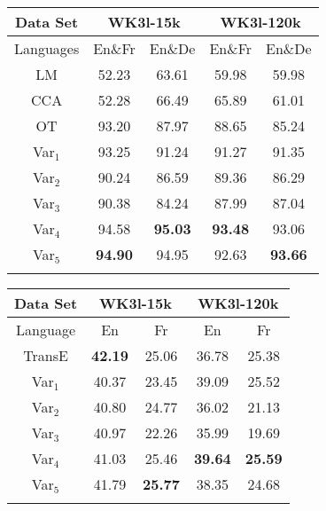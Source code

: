 \documentclass{article}
\begin{document}
\begin{table*}[t!]
\begin{minipage}[t]{0.37\linewidth}
\centering
\captionsetup{justification=centering}
\caption{Accuracy of TWA verification (\%).}\label{tbl:alignment}
\vspace{-1em}
{\scriptsize
\begin{tabular}{c|cc|cc}
\bhline
Data Set & \multicolumn{2}{c|}{WK3l-15k} & \multicolumn{2}{c}{WK3l-120k}\\
\hline
Languages &  En\&Fr & En\&De & En\&Fr & En\&De\\
\bhline
LM&52.23&63.61&59.98&59.98\\
CCA&52.28&66.49&65.89&61.01\\
OT&93.20&87.97&88.65&85.24\\
\hline
Var${_1}$&93.25&91.24&91.27&91.35\\
Var${_2}$&90.24&86.59&89.36&86.29\\
Var${_3}$&90.38&84.24&87.99&87.04\\
Var${_4}$&94.58&\textbf{95.03}&\textbf{93.48}&93.06\\
Var${_5}$&\textbf{94.90}&94.95&92.63&\textbf{93.66}\\
\bhline
\end{tabular}
}
\end{minipage}
\hfill
\begin{minipage}[t]{0.3\linewidth}
\centering
\captionsetup{justification=centering}
\caption{Results of tail prediction ($\hits$).}\label{tbl:tail}
\vspace{-1em}
{\scriptsize
\begin{tabular}{c|cc|cc}
\bhline
Data Set & \multicolumn{2}{c|}{WK3l-15k} & \multicolumn{2}{c}{WK3l-120k}\\
\hline
Language & En & Fr & En & Fr\\
\bhline
TransE&\textbf{42.19}&25.06&36.78&25.38\\
Var${_1}$&40.37&23.45&39.09&25.52\\
Var${_2}$&40.80&24.77&36.02&21.13\\
Var${_3}$&40.97&22.26&35.99&19.69\\
Var${_4}$&41.03&25.46&\textbf{39.64}&\textbf{25.59}\\
Var${_5}$&41.79&\textbf{25.77}&38.35&24.68\\
\bhline
\end{tabular}
}
\end{minipage}
\hfill
\begin{minipage}[t]{0.3\linewidth}
\centering
\captionsetup{justification=centering}

\end{minipage}
\end{table*}
\end{document}
